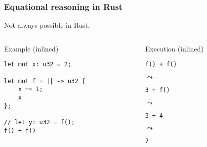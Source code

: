 \documentclass[t]{beamer}
\begin{document}
\begin{frame}[fragile]
\frametitle{Equational reasoning in Rust}
Not always possible in Rust.

\begin{columns}

\begin{column}[T]{0.48\textwidth}
\begin{block}{Example (inlined)}
\begin{verbatim}
let mut x: u32 = 2;

let mut f = || -> u32 {
    x += 1;
    x
};

// let y: u32 = f();
f() + f()
\end{verbatim}
\end{block}
\end{column}

\begin{column}[T]{0.48\textwidth}
\begin{block}{Execution (inlined)}
\begin{verbatim}
f() + f()
\end{verbatim}

\(\leadsto\)

\begin{verbatim}
3 + f()
\end{verbatim}

\(\leadsto\)

\begin{verbatim}
3 + 4
\end{verbatim}

\(\leadsto\)

\begin{verbatim}
7
\end{verbatim}
\end{block}
\end{column}

\end{columns}

\end{frame}
\end{document}
